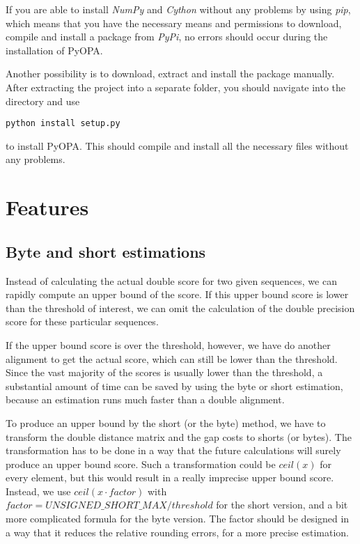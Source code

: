 \documentclass[12pt]{article}
\newcommand{\pp}{PyOPA}
\begin{document}
If you are able to install \emph{NumPy} and \emph{Cython} without any problems by using \emph{pip}, which means that you have the necessary means and permissions to download, compile and install a package from \emph{PyPi}, no errors should occur during the installation of \pp{}.

Another possibility is to download, extract and install the package manually. After extracting the project into a separate folder, you should navigate into the directory and use

\begin{lstlisting}
python install setup.py
\end{lstlisting}

to install \pp{}. This should compile and install all the necessary files without any problems.

\section{Features}
\label{sec:features}

\subsection{Byte and short estimations}
\label{sec:bsEstim}
Instead of calculating the actual double score for two given sequences, we can rapidly compute an upper bound of the score. If this upper bound score is lower than the threshold of interest, we can omit the calculation of the double precision score for these particular sequences.

If the upper bound score is over the threshold, however, we have do another alignment to get the actual
 score, which can still be lower than the threshold. Since the vast majority of the scores is usually lower than the threshold, a substantial amount of time can be saved by using the byte or short estimation, because an estimation runs much faster than a double alignment.

To produce an upper bound by the short (or the byte) method, we have to transform the double distance matrix and the gap costs to shorts (or bytes). The transformation has to be done in a way that the future calculations will surely produce an upper bound score. Such a transformation could be $ceil(x)$ for every element, but this would result in a really imprecise upper bound score. Instead, we use $ceil(x \cdot factor)$ with $factor=UNSIGNED\_SHORT\_MAX / threshold$ for the short version, and a bit more complicated formula for the byte version. The factor should be designed in a way that it reduces the relative rounding errors, for a more precise estimation.
\end{document}

